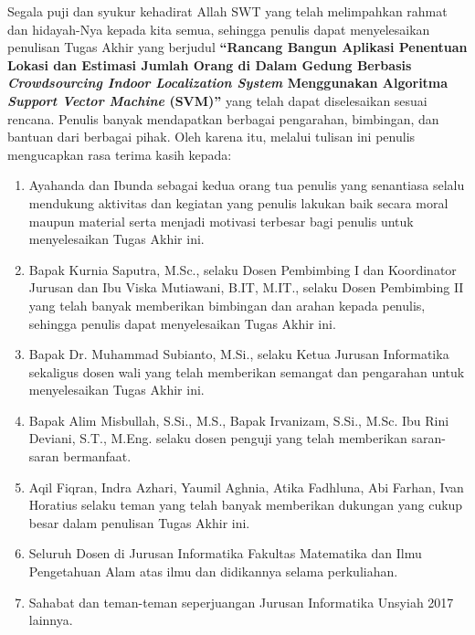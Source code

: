 \preface %


Segala puji dan syukur kehadirat Allah SWT yang telah melimpahkan rahmat dan hidayah-Nya kepada kita semua, sehingga penulis dapat menyelesaikan penulisan Tugas Akhir yang berjudul \textbf{“Rancang Bangun Aplikasi Penentuan Lokasi dan Estimasi Jumlah Orang di Dalam Gedung Berbasis \textit{Crowdsourcing Indoor Localization System} Menggunakan Algoritma \textit{Support Vector Machine} (SVM)”} yang telah dapat diselesaikan sesuai rencana. Penulis banyak mendapatkan berbagai pengarahan, bimbingan, dan bantuan dari berbagai pihak. Oleh karena itu, melalui tulisan ini penulis mengucapkan rasa terima kasih kepada:

\begin{enumerate}
	\item{Ayahanda dan Ibunda sebagai kedua orang tua penulis yang senantiasa selalu mendukung aktivitas dan kegiatan yang penulis lakukan baik secara moral maupun material serta menjadi motivasi terbesar bagi penulis untuk menyelesaikan Tugas Akhir ini.}
	\item{Bapak Kurnia Saputra, M.Sc., selaku Dosen Pembimbing I dan Koordinator Jurusan dan Ibu Viska Mutiawani, B.IT, M.IT., selaku Dosen Pembimbing II yang telah banyak memberikan bimbingan dan arahan kepada penulis, sehingga penulis dapat menyelesaikan Tugas Akhir ini.}
	\item {Bapak Dr. Muhammad Subianto, M.Si., selaku Ketua Jurusan Informatika sekaligus dosen wali yang telah memberikan semangat dan pengarahan untuk menyelesaikan Tugas Akhir ini.}
	\item {Bapak Alim Misbullah, S.Si., M.S., Bapak Irvanizam, S.Si., M.Sc. Ibu Rini Deviani, S.T., M.Eng. selaku dosen penguji yang telah memberikan saran-saran bermanfaat.}
	\item {Aqil Fiqran, Indra Azhari, Yaumil Aghnia, Atika Fadhluna, Abi Farhan, Ivan Horatius selaku teman yang telah banyak memberikan dukungan yang cukup besar dalam penulisan Tugas Akhir ini.}
	      \item{Seluruh Dosen di Jurusan Informatika Fakultas Matematika dan Ilmu Pengetahuan Alam atas ilmu dan didikannya selama perkuliahan.}
	      \item{Sahabat dan teman-teman seperjuangan Jurusan Informatika Unsyiah 2017 lainnya.}
\end{enumerate}

